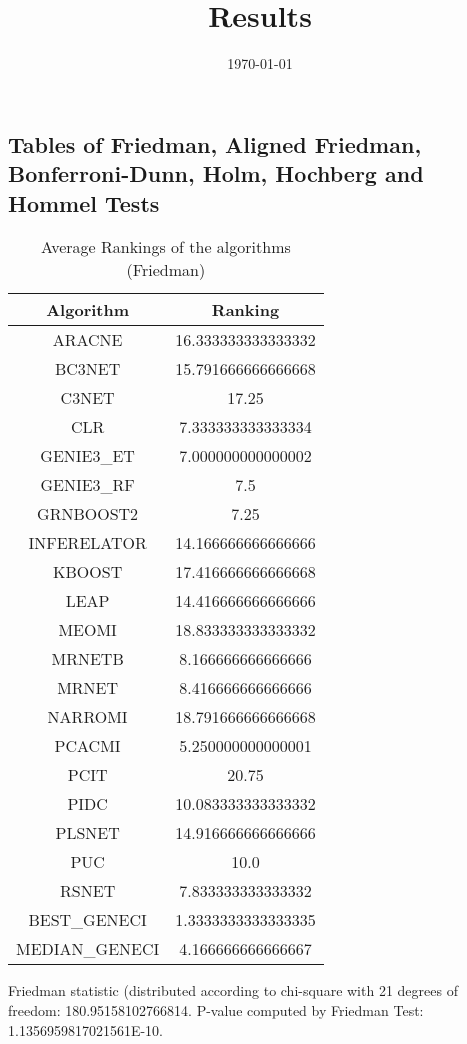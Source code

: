 \documentclass[a4paper,10pt]{article}
\title{Results}
\author{}
\date{\today}
\begin{document}
\begin{landscape}
\oddsidemargin 0in \topmargin 0in\maketitle
\section{Tables of Friedman, Aligned Friedman, Bonferroni-Dunn, Holm, Hochberg and Hommel Tests}
\begin{table}[!htp]
\centering
\caption{Average Rankings of the algorithms (Friedman)
}\begin{tabular}{c|c}
Algorithm&Ranking\\
\hline
ARACNE&16.333333333333332\\
BC3NET&15.791666666666668\\
C3NET&17.25\\
CLR&7.333333333333334\\
GENIE3_ET&7.000000000000002\\
GENIE3_RF&7.5\\
GRNBOOST2&7.25\\
INFERELATOR&14.166666666666666\\
KBOOST&17.416666666666668\\
LEAP&14.416666666666666\\
MEOMI&18.833333333333332\\
MRNETB&8.166666666666666\\
MRNET&8.416666666666666\\
NARROMI&18.791666666666668\\
PCACMI&5.250000000000001\\
PCIT&20.75\\
PIDC&10.083333333333332\\
PLSNET&14.916666666666666\\
PUC&10.0\\
RSNET&7.833333333333332\\
BEST_GENECI&1.3333333333333335\\
MEDIAN_GENECI&4.166666666666667\\
\end{tabular}
\end{table}


Friedman statistic (distributed according to chi-square with 21 degrees of freedom: 180.95158102766814. 
P-value computed by Friedman Test: 1.1356959817021561E-10.\newline


\end{landscape}
\end{document}
